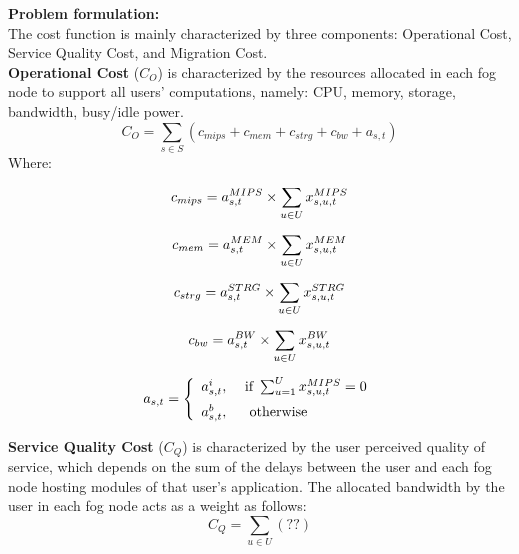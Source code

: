 \documentclass{article}
\begin{document}
\pagebreak
\noindent\textbf{Problem formulation:}\\[6pt]
The cost function is mainly characterized by three components: Operational Cost, Service Quality Cost, and Migration Cost.\\[6pt]

\noindent\textbf{Operational Cost} ($C_O$) is characterized by the resources allocated in each fog node to support all users' computations, namely: CPU, memory, storage, bandwidth, busy/idle power.
\begin{equation}
C_O = \sum_{s \in S} \left( c_{mips} + c_{mem} + c_ {strg} + c_{bw} + a_{s,t}\right)
\end{equation}
Where:

\begin{gather}
c_{mips} = a^{MIPS}_{s,t} \times \sum_{u \in U} x^{MIPS}_{s,u,t}\\[6pt]
c_{mem} =  a^{MEM}_{s,t} \times \sum_{u \in U} x^{MEM}_{s,u,t}\\[6pt]
c_ {strg} =  a^{STRG}_{s,t} \times \sum_{u \in U} x^{STRG}_{s,u,t}\\[6pt]
c_{bw} = a^{BW}_{s,t} \times \sum_{u \in U} x^{BW}_{s,u,t}\\[6pt]
a_{s,t} = \left\{ \begin{array}{ll} a^i_{s,t}, & \text{ if }\sum_{u=1}^Ux^{MIPS}_{s,u,t} = 0 \\[6pt]
a^b_{s,t}, & \text{ \text{ otherwise } } \end{array} \right.
\end{gather}

\vspace{12pt}
\noindent\textbf{Service Quality Cost} ($C_Q$) is characterized by the user perceived quality of service, which depends on the sum of the delays between the user and each fog node hosting modules of that user's application. The allocated bandwidth by the user in each fog node acts as a weight as follows:
\begin{equation}
C_Q = \sum_{u \in U} \left( ?? \right)
\end{equation}
\end{document}
